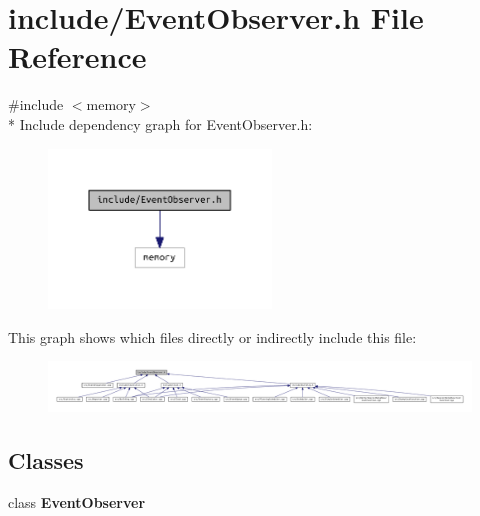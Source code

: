 \section{include/\+Event\+Observer.h File Reference}
\label{_event_observer_8h}
{\ttfamily \#include $<$memory$>$}\\*
Include dependency graph for Event\+Observer.\+h\+:
\nopagebreak
\begin{figure}[H]
\begin{center}
\leavevmode
\includegraphics[width=168pt]{_event_observer_8h__incl}
\end{center}
\end{figure}
This graph shows which files directly or indirectly include this file\+:
\nopagebreak
\begin{figure}[H]
\begin{center}
\leavevmode
\includegraphics[width=350pt]{_event_observer_8h__dep__incl}
\end{center}
\end{figure}
\subsection*{Classes}
\begin{DoxyCompactItemize}
\item 
class {\bf Event\+Observer}
\end{DoxyCompactItemize}

